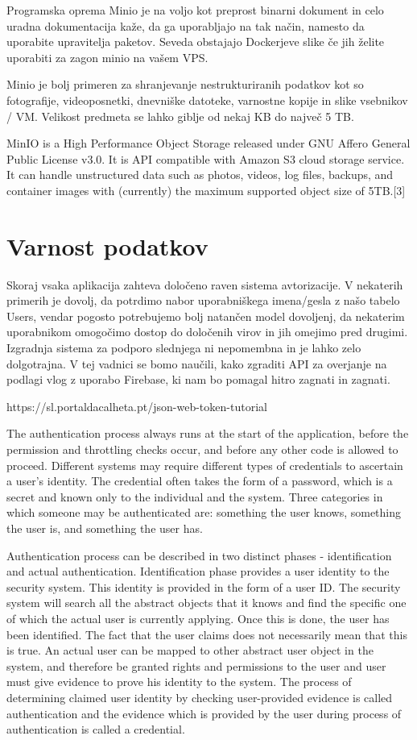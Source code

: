 \documentclass[a4paper, 12pt]{book}
\begin{document}
Programska oprema Minio je na voljo kot preprost binarni dokument in celo uradna dokumentacija kaže, da ga uporabljajo na tak način, namesto da uporabite upravitelja paketov. Seveda obstajajo Dockerjeve slike če jih želite uporabiti za zagon minio na vašem VPS.

Minio je bolj primeren za shranjevanje nestrukturiranih podatkov kot so fotografije, videoposnetki, dnevniške datoteke, varnostne kopije in slike vsebnikov / VM. Velikost predmeta se lahko giblje od nekaj KB do največ 5 TB.

MinIO is a High Performance Object Storage released under GNU Affero General Public License v3.0. It is API compatible with Amazon S3 cloud storage service. It can handle unstructured data such as photos, videos, log files, backups, and container images with (currently) the maximum supported object size of 5TB.[3]

\section{Varnost podatkov}

Skoraj vsaka aplikacija zahteva določeno raven sistema avtorizacije. V nekaterih primerih je dovolj, da potrdimo nabor uporabniškega imena/gesla z našo tabelo Users, vendar pogosto potrebujemo bolj natančen model dovoljenj, da nekaterim uporabnikom omogočimo dostop do določenih virov in jih omejimo pred drugimi. 
Izgradnja sistema za podporo slednjega ni nepomembna in je lahko zelo dolgotrajna. V tej vadnici se bomo naučili, kako zgraditi API za overjanje na podlagi vlog z uporabo Firebase, ki nam bo pomagal hitro zagnati in zagnati.

https://sl.portaldacalheta.pt/json-web-token-tutorial

The authentication process always runs at the start of the application, before the permission and throttling checks occur, and before any other code is allowed to proceed. Different systems may require different types of credentials to ascertain a user’s identity. The credential often takes the form of a password, which is a secret and known only to the individual and the system. Three categories in which someone may be authenticated are: something the user knows, something the user is, and something the user has.

Authentication process can be described in two distinct phases - identification and actual authentication. Identification phase provides a user identity to the security system. This identity is provided in the form of a user ID. The security system will search all the abstract objects that it knows and find the specific one of which the actual user is currently applying. Once this is done, the user has been identified. The fact that the user claims does not necessarily mean that this is true. An actual user can be mapped to other abstract user object in the system, and therefore be granted rights and permissions to the user and user must give evidence to prove his identity to the system. The process of determining claimed user identity by checking user-provided evidence is called authentication and the evidence which is provided by the user during process of authentication is called a credential.
\end{document}

